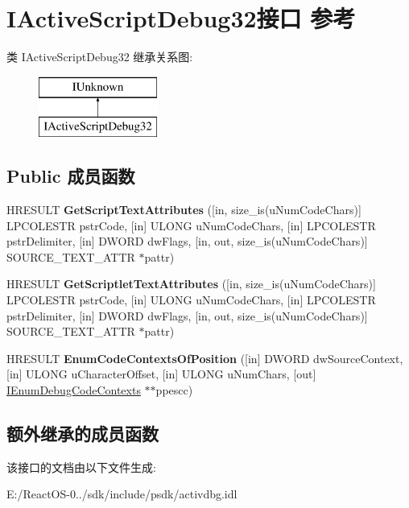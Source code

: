 \hypertarget{interface_i_active_script_debug32}{}\section{I\+Active\+Script\+Debug32接口 参考}
\label{interface_i_active_script_debug32}
类 I\+Active\+Script\+Debug32 继承关系图\+:\begin{figure}[H]
\begin{center}
\leavevmode
\includegraphics[height=2.000000cm]{interface_i_active_script_debug32}
\end{center}
\end{figure}
\subsection*{Public 成员函数}
\begin{DoxyCompactItemize}
\item 
\mbox{\label{interface_i_active_script_debug32_ab711e41f3d1c29123b3d28a58164d86d}} 
H\+R\+E\+S\+U\+LT {\bfseries Get\+Script\+Text\+Attributes} (\mbox{[}in, size\+\_\+is(u\+Num\+Code\+Chars)\mbox{]} L\+P\+C\+O\+L\+E\+S\+TR pstr\+Code, \mbox{[}in\mbox{]} U\+L\+O\+NG u\+Num\+Code\+Chars, \mbox{[}in\mbox{]} L\+P\+C\+O\+L\+E\+S\+TR pstr\+Delimiter, \mbox{[}in\mbox{]} D\+W\+O\+RD dw\+Flags, \mbox{[}in, out, size\+\_\+is(u\+Num\+Code\+Chars)\mbox{]} S\+O\+U\+R\+C\+E\+\_\+\+T\+E\+X\+T\+\_\+\+A\+T\+TR $\ast$pattr)
\item 
\mbox{\label{interface_i_active_script_debug32_ae3ff0b17725ffc53ebd7e6d9500e65a9}} 
H\+R\+E\+S\+U\+LT {\bfseries Get\+Scriptlet\+Text\+Attributes} (\mbox{[}in, size\+\_\+is(u\+Num\+Code\+Chars)\mbox{]} L\+P\+C\+O\+L\+E\+S\+TR pstr\+Code, \mbox{[}in\mbox{]} U\+L\+O\+NG u\+Num\+Code\+Chars, \mbox{[}in\mbox{]} L\+P\+C\+O\+L\+E\+S\+TR pstr\+Delimiter, \mbox{[}in\mbox{]} D\+W\+O\+RD dw\+Flags, \mbox{[}in, out, size\+\_\+is(u\+Num\+Code\+Chars)\mbox{]} S\+O\+U\+R\+C\+E\+\_\+\+T\+E\+X\+T\+\_\+\+A\+T\+TR $\ast$pattr)
\item 
\mbox{\label{interface_i_active_script_debug32_a73767a3d342a7d431a6b752111190e06}} 
H\+R\+E\+S\+U\+LT {\bfseries Enum\+Code\+Contexts\+Of\+Position} (\mbox{[}in\mbox{]} D\+W\+O\+RD dw\+Source\+Context, \mbox{[}in\mbox{]} U\+L\+O\+NG u\+Character\+Offset, \mbox{[}in\mbox{]} U\+L\+O\+NG u\+Num\+Chars, \mbox{[}out\mbox{]} \hyperlink{interface_i_enum_debug_code_contexts}{I\+Enum\+Debug\+Code\+Contexts} $\ast$$\ast$ppescc)
\end{DoxyCompactItemize}
\subsection*{额外继承的成员函数}


该接口的文档由以下文件生成\+:\begin{DoxyCompactItemize}
\item 
E\+:/\+React\+O\+S-\/0../sdk/include/psdk/activdbg.\+idl\end{DoxyCompactItemize}
